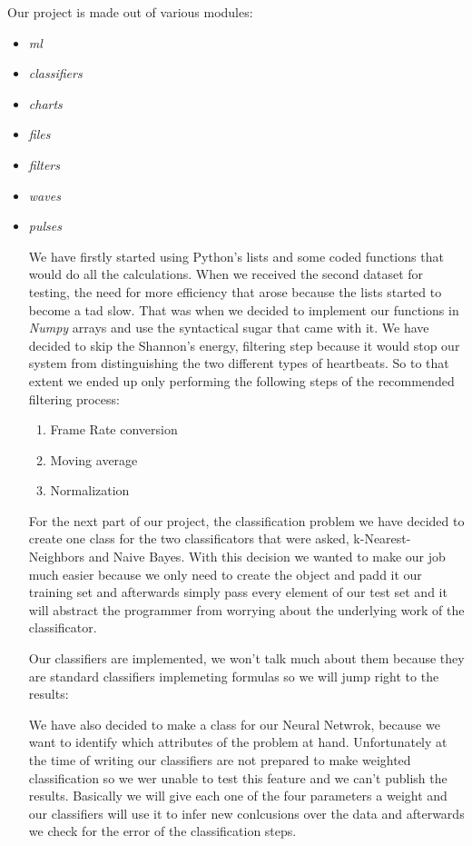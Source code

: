 \documentclass[conference]{IEEEtran}
\begin{document}
Our project is made out of various modules:
\begin{itemize}
	\item \textit{ml}
	\item \textit{classifiers}
	\item \textit{charts}
	\item \textit{files}
	\item \textit{filters}
	\item \textit{waves}
	\item \textit{pulses}
\begin{itemize}

We have firstly started using Python's lists and some coded functions that would
do all the calculations. When we received the second dataset for testing, the
need for more efficiency that arose because the lists started to become a tad
slow. That was when we decided to implement our functions in \textit{Numpy}
arrays and use the syntactical sugar that came with it. We have decided to
skip the Shannon's energy, filtering step because it would stop our system from
distinguishing the two different types of heartbeats. So to that extent we
ended up only performing the following steps of the recommended filtering
process:
\begin{enumerate}
	\item Frame Rate conversion
	\item Moving average
	\item Normalization
\end{enumerate}

For the next part of our project, the classification problem we have decided to
create one class for the two classificators that were asked, k-Nearest-Neighbors
and Naive Bayes. With this decision we wanted to make our job much easier
because we only need to create the object and padd it our training set and
afterwards simply pass every element of our test set and it will abstract the
programmer from worrying about the underlying work of the classificator.

Our classifiers are implemented, we won't talk much about them because they are
standard classifiers implemeting formulas so we will jump right to the results:

We have also decided to make a class for our Neural Netwrok, because we want to
identify which attributes of the problem at hand. Unfortunately at the time of
writing our classifiers are not prepared to make weighted classification so we
wer unable to test this feature and we can't publish the results.
Basically we will give each one of the four parameters a weight and our
classifiers will use it to infer new conlcusions over the data and afterwards
we check for the error of the classification steps.


\end{itemize}
\end{itemize}
\end{document}
